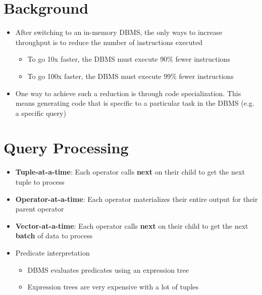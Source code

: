\documentclass[11pt]{article}
\begin{document}
\maketitle
\thispagestyle{plain}

\section{Background}
\begin{itemize}
    \item After switching to an in-memory DBMS, the only ways to increase throughput is to reduce the number of instructions executed
        \begin{itemize}
            \item To go 10x faster, the DBMS must execute 90\% fewer instructions
            \item To go 100x faster, the DBMS must execute 99\% fewer instructions
        \end{itemize}
    \item One way to achieve such a reduction is through code specialization. This means generating code that is specific to a particular task in the DBMS (e.g. a specific query)
\end{itemize}


\section{Query Processing}
\begin{itemize}
    \item \textbf{Tuple-at-a-time}: Each operator calls \textbf{next} on their child to get the next tuple to process
    \item \textbf{Operator-at-a-time}: Each operator materializes their entire output for their parent operator
    \item \textbf{Vector-at-a-time}: Each operator calls \textbf{next} on their child to get the next \textbf{batch} of data to process
    \item Predicate interpretation
    \begin{itemize}
        \item DBMS evaluates predicates using an expression tree
        \item Expression trees are very expensive with a lot of tuples
    \end{itemize}
\end{itemize}
\end{document}
